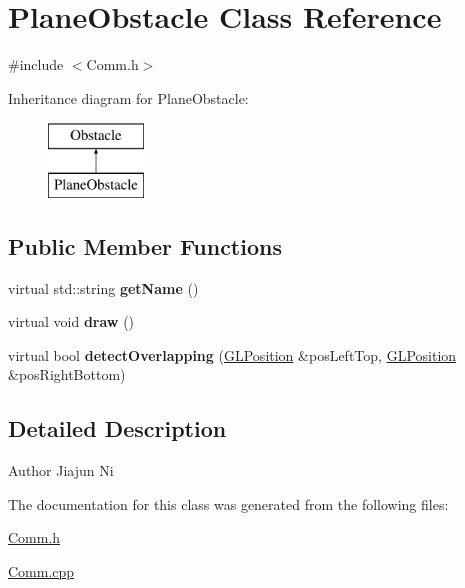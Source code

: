 \hypertarget{classPlaneObstacle}{\section{Plane\-Obstacle Class Reference}
\label{classPlaneObstacle}
}


{\ttfamily \#include $<$Comm.\-h$>$}

Inheritance diagram for Plane\-Obstacle\-:\begin{figure}[H]
\begin{center}
\leavevmode
\includegraphics[height=2.000000cm]{classPlaneObstacle}
\end{center}
\end{figure}
\subsection*{Public Member Functions}
\begin{DoxyCompactItemize}
\item 
\hypertarget{classPlaneObstacle_a2da0ae77b8e6421daa5faa57b2d8cdbc}{virtual std\-::string {\bfseries get\-Name} ()}\label{classPlaneObstacle_a2da0ae77b8e6421daa5faa57b2d8cdbc}

\item 
\hypertarget{classPlaneObstacle_a182b1bf170606ab7ebff0695400a2d6a}{virtual void {\bfseries draw} ()}\label{classPlaneObstacle_a182b1bf170606ab7ebff0695400a2d6a}

\item 
\hypertarget{classPlaneObstacle_a91bfc750e4d174caa878097713358c3b}{virtual bool {\bfseries detect\-Overlapping} (\hyperlink{structGLPosition}{G\-L\-Position} \&pos\-Left\-Top, \hyperlink{structGLPosition}{G\-L\-Position} \&pos\-Right\-Bottom)}\label{classPlaneObstacle_a91bfc750e4d174caa878097713358c3b}

\end{DoxyCompactItemize}


\subsection{Detailed Description}
\begin{DoxyAuthor}{Author}
Jiajun Ni 
\end{DoxyAuthor}


The documentation for this class was generated from the following files\-:\begin{DoxyCompactItemize}
\item 
\hyperlink{Comm_8h}{Comm.\-h}\item 
\hyperlink{Comm_8cpp}{Comm.\-cpp}\end{DoxyCompactItemize}

